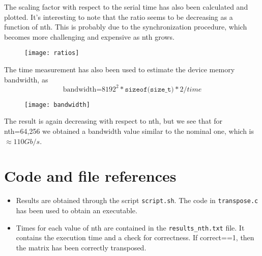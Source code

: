 \documentclass[10pt,a4paper]{article}
\begin{document}
The scaling factor with respect to the serial time has also been calculated and plotted. It's interesting to note that the ratio seems to be decreasing as a function of nth. This is probably due to the synchronization procedure, which becomes more challenging and expensive as nth grows.

\begin{figure}[h]
	\centering
	\texttt{[image: ratios]}
	\caption*{}
	\label{fig:ratio}
\end{figure}

The time measurement has also been used to estimate the device memory bandwidth, as $$\text{bandwidth=} 8192^2* \texttt{sizeof(size\_t)}* 2/time$$

\begin{figure}[h!]
	\centering
	\texttt{[image: bandwidth]}
	\caption*{}
	\label{fig:bandwidth}
\end{figure}

The result is again decreasing with respect to nth, but we see that for nth=64,256 we obtained a bandwidth value similar to the nominal one, which is $\approx 110 Gb/s$.
\newpage
\section*{Code and file references}

\begin{itemize}
	\item Results are obtained through the script \texttt{script.sh}. The code in \texttt{transpose.c} has been used to obtain an executable.
	\item Times for each value of nth are contained in the \texttt{results\_nth.txt} file. It contains the execution time and a check for correctness. If correct==1, then the matrix has been correctly transposed.
\end{itemize}		
\end{document}
